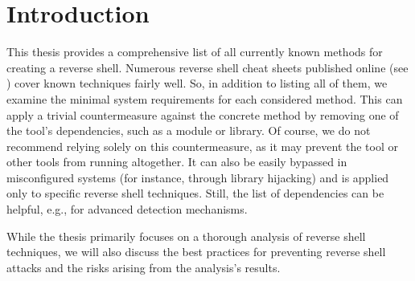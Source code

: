 \chapter*{Introduction} %


This thesis provides a comprehensive list of all currently known methods for creating a reverse shell. Numerous reverse shell cheat sheets published online (see \cite{cheatsheet1, cheatsheet2, cheatsheet3}) cover known techniques fairly well. So, in addition to listing all of them, we examine the minimal system requirements for each considered method. This can apply a trivial countermeasure against the concrete method by removing one of the tool's dependencies, such as a module or library. Of course, we do not recommend relying solely on this countermeasure, as it may prevent the tool or other tools from running altogether. It can also be easily bypassed in misconfigured systems (for instance, through library hijacking) and is applied only to specific reverse shell techniques. Still, the list of dependencies can be helpful, e.g., for advanced detection mechanisms.

While the thesis primarily focuses on a thorough analysis of reverse shell techniques, we will also discuss the best practices for preventing reverse shell attacks and the risks arising from the analysis's results.
